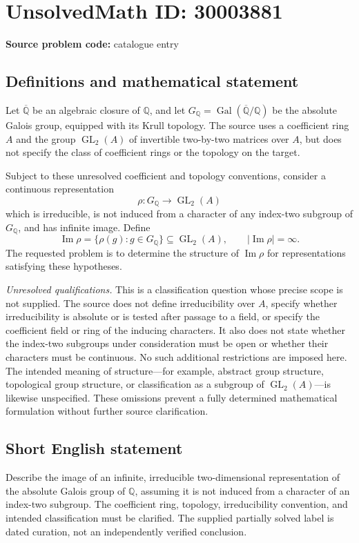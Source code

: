 \documentclass[11pt]{article}
\newcommand{\Q}{\mathbb{Q}}
\begin{document}
\section*{UnsolvedMath ID: 30003881}
\textbf{Source problem code:} catalogue entry
\subsection{Definitions and mathematical statement}
Let \(\overline{\Q}\) be an algebraic closure of \(\Q\), and let \(G_{\Q}=\operatorname{Gal}(\overline{\Q}/\Q)\) be the absolute Galois group, equipped with its Krull topology. The source uses a coefficient ring \(A\) and the group \(\operatorname{GL}_2(A)\) of invertible two-by-two matrices over \(A\), but does not specify the class of coefficient rings or the topology on the target.

Subject to these unresolved coefficient and topology conventions, consider a continuous representation
\[
\rho:G_{\Q}\longrightarrow\operatorname{GL}_2(A)
\]
which is irreducible, is not induced from a character of any index-two subgroup of \(G_{\Q}\), and has infinite image. Define
\[
\operatorname{Im}\rho=\{\rho(g):g\in G_{\Q}\}\subseteq\operatorname{GL}_2(A),
\qquad |\operatorname{Im}\rho|=\infty.
\]
The requested problem is to determine the structure of \(\operatorname{Im}\rho\) for representations satisfying these hypotheses.

\textit{Unresolved qualifications.} This is a classification question whose precise scope is not supplied. The source does not define irreducibility over \(A\), specify whether irreducibility is absolute or is tested after passage to a field, or specify the coefficient field or ring of the inducing characters. It also does not state whether the index-two subgroups under consideration must be open or whether their characters must be continuous. No such additional restrictions are imposed here. The intended meaning of structure---for example, abstract group structure, topological group structure, or classification as a subgroup of \(\operatorname{GL}_2(A)\)---is likewise unspecified. These omissions prevent a fully determined mathematical formulation without further source clarification.
\subsection{Short English statement}
Describe the image of an infinite, irreducible two-dimensional representation of the absolute Galois group of \(\Q\), assuming it is not induced from a character of an index-two subgroup. The coefficient ring, topology, irreducibility convention, and intended classification must be clarified. The supplied partially solved label is dated curation, not an independently verified conclusion.
\end{document}
